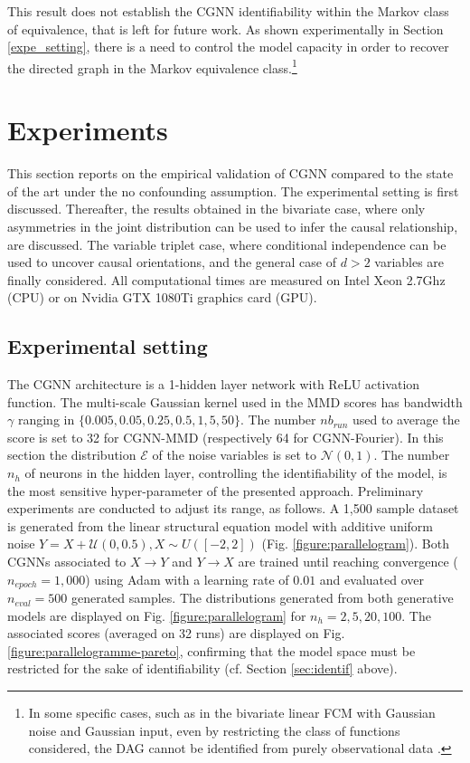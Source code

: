 \documentclass[a4paper, 11pt]{article}
\begin{document}
This result does not establish the  CGNN identifiability within the Markov class of equivalence, that is left for future work. As shown experimentally in Section \ref{expe_setting}, there is a need to control the model capacity in order to recover the directed graph in the Markov equivalence class.\footnote{In some specific cases, such as in the bivariate linear FCM with Gaussian noise and Gaussian input, even by restricting the class of functions considered, the DAG cannot be identified from purely observational data \citep{mooij2016distinguishing}.}


\section{Experiments}\label{sec:expe}


This section reports on the empirical validation of CGNN compared to the state of the art under the no confounding assumption. The experimental setting is first discussed. Thereafter, the results obtained in the bivariate case, where only asymmetries in the joint distribution can be used to infer the causal relationship, are discussed. The variable triplet case, where conditional independence can be used to uncover causal orientations, and the general case of $d > 2$ variables are finally considered. 
All computational times are measured on Intel Xeon 2.7Ghz (CPU) or on Nvidia GTX 1080Ti graphics card (GPU).

\subsection{Experimental setting \label{expe_setting}}

The CGNN architecture is a 1-hidden layer network with ReLU activation function. The multi-scale Gaussian kernel used in the MMD scores has bandwidth $\gamma$ ranging in $\{0.005, 0.05, 0.25,0.5, 1,5,50\}$. The number $nb_{run}$ used to average the score is set to 32 for CGNN-MMD (respectively 64 for CGNN-Fourier).  In this section the distribution $\mathcal{E}$ of the noise variables is set to $\mathcal{N}(0,1)$. 
The number $n_h$ of neurons in the hidden layer, controlling the identifiability of the model, is the most sensitive hyper-parameter of the presented approach. Preliminary experiments are conducted to adjust its range, as follows. A 1,500 sample dataset is generated from the linear structural equation model with additive uniform noise $Y=X+\mathcal{U}(0, 0.5), X \sim U([-2,2])$ (Fig. \ref{figure:parallelogram}). Both CGNNs associated to $X \rightarrow Y$ and $Y \rightarrow X$ are trained until reaching convergence ($n_{epoch} = 1,000$) using Adam \citep{2014arXiv1412.6980K} with a learning rate of $0.01$ and evaluated over $n_{eval} = 500$ generated samples. The distributions generated from both generative models are displayed on Fig. \ref{figure:parallelogram} for $n_h = 2, 5, 20, 100$. The associated scores (averaged on 32 runs) are  displayed on Fig. \ref{figure:parallelogramme-pareto}, confirming that the model space must be restricted for the sake of identifiability (cf. Section \ref{sec:identif} above).
\end{document}
